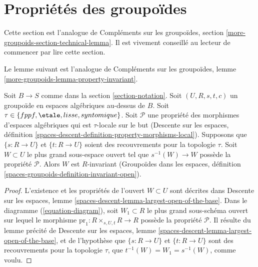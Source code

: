 \section{Propriétés des groupoïdes}
\label{section-technical-lemma}

\noindent
Cette section est l'analogue de
Compléments sur les groupoïdes, section \ref{more-groupoids-section-technical-lemma}.
Il est vivement conseillé au lecteur de commencer par lire cette section.

\medskip\noindent
Le lemme suivant est l'analogue de
Compléments sur les groupoïdes, lemme \ref{more-groupoids-lemma-property-invariant}.

\begin{lemma}
\label{lemma-property-invariant}
Soit $B \to S$ comme dans la section \ref{section-notation}.
Soit $(U, R, s, t, c)$ un groupoïde en espaces algébriques au-dessus de $B$.
Soit
$\tau \in \{fppf, \linebreak[0] \etale, \linebreak[0]
lisse, \linebreak[0] syntomique\}$.
Soit $\mathcal{P}$ une propriété des morphismes d'espaces algébriques
qui est $\tau$-locale sur le but
(Descente sur les espaces,
définition \ref{spaces-descent-definition-property-morphisms-local}).
Supposons que $\{s : R \to U\}$ et $\{t : R \to U\}$ soient des recouvrements
pour la topologie $\tau$. Soit $W \subset U$ le plus grand sous-espace ouvert
tel que $s^{-1}(W) \to W$ possède la propriété $\mathcal{P}$.
Alors $W$ est $R$-invariant
(Groupoïdes dans les espaces,
définition \ref{spaces-groupoids-definition-invariant-open}).
\end{lemma}

\begin{proof}
L'existence et les propriétés de l'ouvert $W \subset U$ sont décrites dans
Descente sur les espaces, lemme \ref{spaces-descent-lemma-largest-open-of-the-base}.
Dans le
diagramme (\ref{equation-diagram}),
soit $W_1 \subset R$ le plus grand sous-schéma ouvert sur lequel le morphisme
$\text{pr}_1 : R \times_{s, U, t} R \to R$ possède la propriété $\mathcal{P}$.
Il résulte du lemme précité de
Descente sur les espaces, lemme \ref{spaces-descent-lemma-largest-open-of-the-base},
et de l'hypothèse que $\{s : R \to U\}$ et $\{t : R \to U\}$ sont des
recouvrements pour la topologie $\tau$, que $t^{-1}(W)=W_1=s^{-1}(W)$, comme voulu.
\end{proof}

